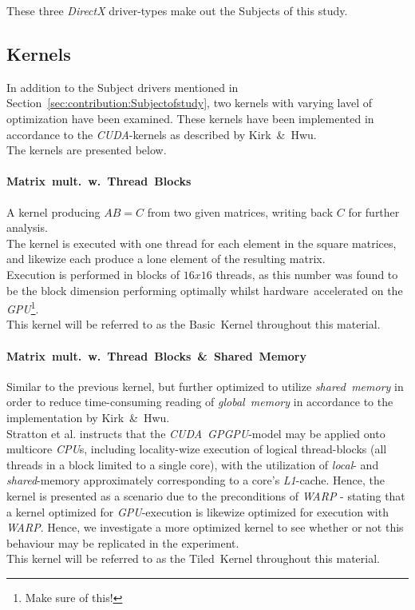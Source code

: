 \documentclass[fleqn,10pt]{SelfArx} %
\begin{document}
\noindent
These three \textit{DirectX} driver-types make out the Subjects of this study.

\subsection{Kernels}
\label{sec:contribution:kernels}
In addition to the Subject drivers mentioned in Section~\ref{sec:contribution:Subjectofstudy}, two kernels with varying lavel of optimization have been examined. These kernels have been implemented in accordance to the \textit{CUDA}-kernels as described by Kirk~\&~Hwu\cite[p.~67, p.~87]{Kirk:2010:PMP:1841511}.\\
The kernels are presented below.
\paragraph{Matrix~mult.~w.~Thread~Blocks}
	A kernel producing $AB=C$ from two given matrices, writing back $C$ for further analysis.\\
	The kernel is executed with one thread for each element in the square matrices, and likewize each produce a lone element of the resulting matrix.\\
	Execution is performed in blocks of $16x16$ threads, as this number was found to be the block dimension performing optimally whilst hardware~accelerated on the \textit{GPU}\footnote{Make sure of this!}.  \\
	This kernel will be referred to as the Basic~Kernel throughout this material.
\paragraph{Matrix~mult.~w.~Thread~Blocks~\&~Shared~Memory}
	Similar to the previous kernel, but further optimized to utilize \textit{shared~memory} in order to reduce time-consuming reading of \textit{global~memory} in accordance to the implementation by Kirk~\&~Hwu\cite[p.~77-93]{Kirk:2010:PMP:1841511}.\\
		Stratton et al.\cite[p.~1-3]{Stratton:2008:MEI:1485701.1485703} instructs that the \textit{CUDA}~\textit{GPGPU}-model may be applied onto multicore \textit{CPU}s, including locality-wize execution of logical thread-blocks (all threads in a block limited to a single core), with the utilization of \textit{local}- and \textit{shared}-memory approximately corresponding to a core's \textit{L1}-cache. Hence, the kernel is presented as a scenario due to the preconditions of \textit{WARP} - stating that a kernel optimized for \textit{GPU}-execution is likewize optimized for execution with \textit{WARP}. Hence, we investigate a more optimized kernel to see whether or not this behaviour may be replicated in the experiment.\\
	This kernel will be referred to as the Tiled~Kernel throughout this material.\\
\end{document}
